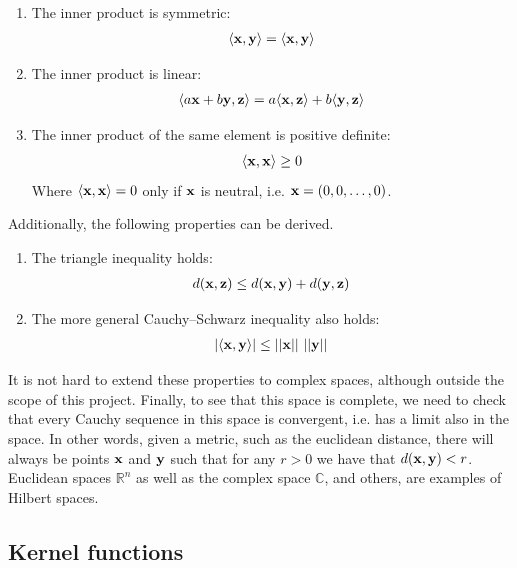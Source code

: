 \begin{enumerate}
    \item The inner product is symmetric:
    \begin{align*}
        \langle\mathbf{x}, \mathbf{y}\rangle = \langle\mathbf{x}, \mathbf{y}\rangle
    \end{align*}
    \item The inner product is linear:
    \begin{align*}
        \langle a\mathbf{x} + b\mathbf{y}, \mathbf{z}\rangle = a\langle\mathbf{x}, \mathbf{z}\rangle + b\langle\mathbf{y}, \mathbf{z}\rangle 
    \end{align*}
    \item The inner product of the same element is positive definite:
    \begin{align*}
        \langle\mathbf{x}, \mathbf{x}\rangle \ge 0
    \end{align*}
    Where $\langle\mathbf{x}, \mathbf{x}\rangle = 0$ only if $\mathbf{x}$ is neutral, i.e. $\mathbf{x} = (0,0,\dots, 0)$. \\
\end{enumerate}
Additionally, the following properties can be derived.

\begin{enumerate}
    \item The triangle inequality holds:
    \begin{align*}
        d(\mathbf{x}, \mathbf{z}) \le d(\mathbf{x}, \mathbf{y}) + d(\mathbf{y}, \mathbf{z}) 
    \end{align*}
    \item The more general Cauchy–Schwarz inequality also holds:
    \begin{align*}
        |\langle\mathbf{x}, \mathbf{y}\rangle| \le ||\mathbf{x}||\ ||\mathbf{y}|| 
    \end{align*}
\end{enumerate}

It is not hard to extend these properties to complex spaces, although outside the scope of this project. Finally, to see that this space is complete, we need to check that every Cauchy sequence in this space is convergent, i.e. has a limit also in the space. In other words, given a metric, such as the euclidean distance, there will always be points $\mathbf{x}$ and $\mathbf{y}$ such that for any $r > 0$ we have that $d(\mathbf{x}, \mathbf{y}) < r$. Euclidean spaces $\mathbb{R}^n$ as well as the complex space $\mathbb{C}$, and others, are examples of Hilbert spaces.

\subsection{Kernel functions}

